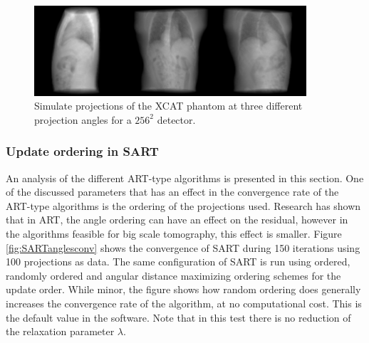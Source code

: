 \begin{figure}[h]
\begin{center}

\includegraphics[width=0.9\textwidth]{Applications/XCATproj.png} 
\end{center}

\caption[Simulated projections of the XCAT phantom]{\label{fig:XCATproj} Simulate projections of the XCAT phantom at three different projection angles for a $256^2$ detector.} 
\end{figure}

\subsubsection{Update ordering in SART}

An analysis of the different ART-type algorithms is presented in this section. One of the discussed parameters that has an effect in the convergence rate of the ART-type algorithms is the ordering of the projections used. Research has shown that in ART, the angle ordering can have an effect on the residual\cite{herman1993algebraic}\cite{zouzias2013randomized}, however in the algorithms feasible for big scale tomography, this effect is smaller. Figure \ref{fig:SARTanglesconv} shows the convergence of SART during 150 iterations using 100 projections as data. The same configuration of SART is run using ordered, randomly ordered and angular distance maximizing ordering schemes for the update order. While minor, the figure shows how random ordering does generally increases the convergence rate of the algorithm, at no computational cost. This is the default value in the software. Note that in this test there is no reduction of the relaxation parameter $\lambda$.


